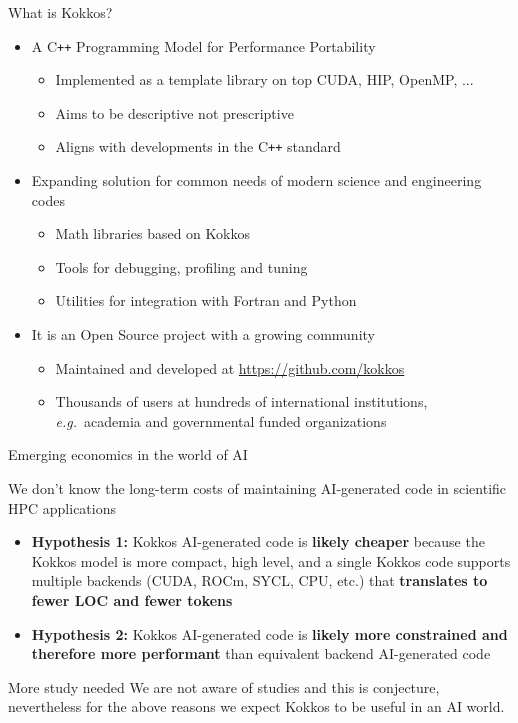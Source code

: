\begin{frame}[fragile]{What is Kokkos?}
	\begin{itemize}
		\item A C\texttt{++} Programming Model for Performance Portability
			\begin{itemize}
				\item Implemented as a template library on top CUDA, HIP, OpenMP, ...
				\item Aims to be descriptive not prescriptive
				\item Aligns with developments in the C\texttt{++} standard
			\end{itemize}
		\item Expanding solution for common needs of modern science and engineering codes
			\begin{itemize}
				\item Math libraries based on Kokkos
				\item Tools for debugging, profiling and tuning
				\item Utilities for integration with Fortran and Python
			\end{itemize}
		\item It is an Open Source project with a growing community
			\begin{itemize}
				\item Maintained and developed at \url{https://github.com/kokkos}
				\item Thousands of users at hundreds of international institutions, \emph{e.g.}\ academia and governmental funded organizations
			\end{itemize}
	\end{itemize}
\end{frame}

\begin{frame}[fragile]{Emerging economics in the world of AI}

We don't know the long-term costs
of maintaining AI-generated code in scientific HPC applications
\begin{itemize}
\item \textbf{Hypothesis 1:}
  Kokkos AI-generated code is
  \textbf{likely cheaper} because the Kokkos model is
  more compact,
  high level,
  and a single Kokkos code
  supports multiple backends (CUDA, ROCm, SYCL, CPU, etc.)
  that \textbf{translates to fewer LOC and fewer tokens}
\item \textbf{Hypothesis 2:} Kokkos AI-generated code is
  \textbf{likely more constrained and therefore more performant}
  than equivalent backend AI-generated code
\end{itemize}

\pause

\begin{block}{More study needed}
  We are not aware of studies and this is conjecture,
  nevertheless for the above reasons
  we expect Kokkos to be useful in an AI world.
\end{block}

\end{frame}

